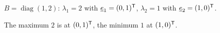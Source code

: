 \begin{example}[A diagonal $B$]
$B=\operatorname{diag}(1,2)$: $\lambda_1=2$ with $\underline{e}_1=(0,1)^{\mathsf{T}}$, $\lambda_2=1$ with $\underline{e}_2=(1,0)^{\mathsf{T}}$.
\begin{deriv}
\end{deriv}
The maximum $2$ is at $(0,1)^{\mathsf{T}}$, the minimum $1$ at $(1,0)^{\mathsf{T}}$.
\end{example}
